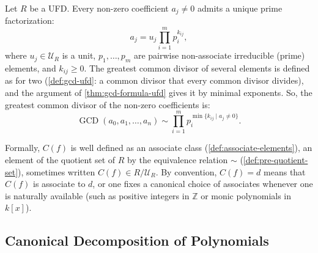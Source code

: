 \begin{content}
Let $R$ be a UFD. Every non-zero coefficient $a_j \neq 0$ admits a unique prime factorization:
\[
a_j = u_j \prod_{i=1}^m p_i^{k_{ij}},
\]
where $u_j \in \mathcal{U}_R$ is a unit, $p_1, \dots, p_m$ are pairwise non-associate irreducible (prime) elements, and $k_{ij} \ge 0$.
The greatest common divisor of several elements is defined as for two (\cref{def:gcd-ufd}: a common divisor that every common divisor divides), and the argument of \cref{thm:gcd-formula-ufd} gives it by minimal exponents. So, the greatest common divisor of the non-zero coefficients is:
\begin{equation}\label{eq:gcd-prime-powers}
\operatorname{GCD}(a_0, a_1, \dots, a_n) \sim \prod_{i=1}^m p_i^{\min \{ k_{ij} \mid a_j \neq 0 \}}.
\end{equation}

\end{content}

\begin{aiNote}
Formally, $C(f)$ is well defined as an associate class (\cref{def:associate-elements}), an element of the quotient set of $R$ by the equivalence relation $\sim$ (\cref{def:pre-quotient-set}), sometimes written $C(f) \in R / \mathcal{U}_R$. By convention, $C(f) = d$ means that $C(f)$ is associate to $d$, or one fixes a canonical choice of associates whenever one is naturally available (such as positive integers in $\mathbb{Z}$ or monic polynomials in $k[x]$).
\end{aiNote}

\subsection{Canonical Decomposition of Polynomials}

